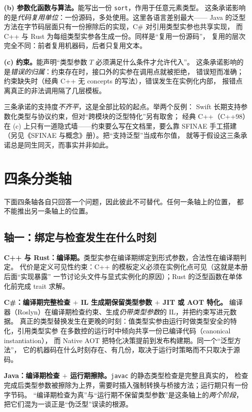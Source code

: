 \documentclass[12pt,a4paper,fontset=fandol]{ctexbook}
\newcommand{\cpp}[1]{C++#1}
\newcommand{\kw}[1]{\texttt{#1}}
\begin{document}
\textbf{(b) 参数化函数与算法。}能写出一份 \kw{sort}，作用于任意元素类型。
这条承诺影响的是\emph{代码复用单位}：一份源码，多处使用。这里各语言差别最大——
Java 的泛型方法在字节码层面只有一份擦除后的实现，C\# 对引用类型实参也共享实现，
而 \cpp{} 与 Rust 为每组类型实参各生成一份。同样是“复用一份源码”，
复用的层次完全不同：前者复用机器码，后者只复用文本。

\textbf{(c) 约束。}能声明“类型参数 $T$ 必须满足什么条件才允许代入”。
这条承诺影响的是\emph{错误的归属}：约束存在时，接口外的实参在调用点就被拒绝，
错误短而准确；约束缺失时（经典 \cpp{} 无 concepts 的写法），错误发生在实例化内部，
报错点离真正的非法调用隔了几层模板。

三条承诺的支持度\emph{不齐平}，这是全部比较的起点。举两个反例：
Swift 长期支持参数化类型与协议约束，但对“跨模块的泛型特化”另有取舍；
经典 \cpp{}（\cpp{98}）在 (c) 上只有一道隐式墙——约束要么写在文档里，要么靠
SFINAE 手工搭建（另见《SFINAE 与概念》册）。把“支持泛型”当成布尔值，
就等于假设这三条承诺总是同生同灭，而事实并非如此。

\section{四条分类轴}

下面四条轴各自只回答一个问题，因此彼此不可替代。任何一条轴上的位置，
都不能推出另一条轴上的位置。

\subsection{轴一：绑定与检查发生在什么时刻}

\textbf{\cpp{} 与 Rust：编译期。}类型实参在编译期绑定到形式参数，合法性在编译期判定。
代价是定义可见性约束：\cpp{} 的模板定义必须在实例化点可见（这就是本册后面“实现暴露”
一节讨论头文件与显式实例化的原因）；Rust 的泛型函数在单体化前完成 trait 求解。

\textbf{C\#：编译期完整检查 $+$ IL 生成期保留类型参数 $+$ JIT 或 AOT 特化。}
编译器（Roslyn）在编译期检查约束、生成\emph{仍带类型参数}的 IL，并把约束写进元数据。
真正的类型替换发生在更晚的时刻：值类型实参由运行时做类型安全的特化，引用类型实参
在多数控的运行时中倾向共享一份已编译代码（canonical instantiation），
而 Native AOT 把特化决策提前到发布构建期。同一个“泛型方法”，
它的机器码在什么时刻存在、有几份，取决于运行时策略而不只取决于源码。

\textbf{Java：编译期检查 $+$ 运行期擦除。}\kw{javac} 的静态类型检查是完整且真实的，
检查完成后类型参数被擦除为上界，需要时插入强制转换与桥接方法；运行期只有一份字节码。
“编译期检查为真”与“运行期不保留类型参数”是这条轴上的\emph{两个阶段}，
把它们混为一谈正是“伪泛型”误读的根源。
\end{document}
